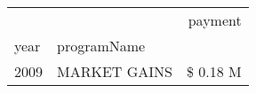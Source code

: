 \begin{tabular}{llr}
\toprule
 &  & payment \\
year & programName &  \\
\midrule
2009 & MARKET GAINS & \$ 0.18 M \\
\cline{1-3}
\bottomrule
\end{tabular}
